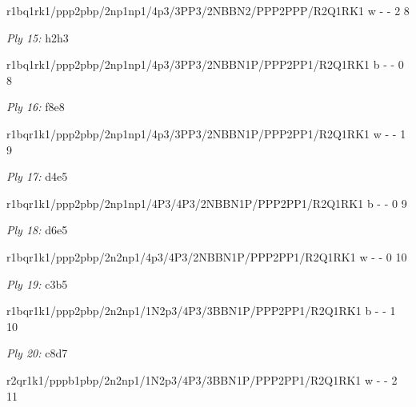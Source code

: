 \documentclass{article}
\begin{document}
r1bq1rk1/ppp2pbp/2np1np1/4p3/3PP3/2NBBN2/PPP2PPP/R2Q1RK1 w - - 2 8


\showboard

\bigskip

\emph{Ply 15:} h2h3


r1bq1rk1/ppp2pbp/2np1np1/4p3/3PP3/2NBBN1P/PPP2PP1/R2Q1RK1 b - - 0 8


\showboard

\bigskip

\emph{Ply 16:} f8e8

r1bqr1k1/ppp2pbp/2np1np1/4p3/3PP3/2NBBN1P/PPP2PP1/R2Q1RK1 w - - 1 9


\showboard

\bigskip

\emph{Ply 17:} d4e5


r1bqr1k1/ppp2pbp/2np1np1/4P3/4P3/2NBBN1P/PPP2PP1/R2Q1RK1 b - - 0 9


\showboard

\bigskip

\emph{Ply 18:} d6e5

r1bqr1k1/ppp2pbp/2n2np1/4p3/4P3/2NBBN1P/PPP2PP1/R2Q1RK1 w - - 0 10


\showboard

\bigskip

\emph{Ply 19:} c3b5


r1bqr1k1/ppp2pbp/2n2np1/1N2p3/4P3/3BBN1P/PPP2PP1/R2Q1RK1 b - - 1 10


\showboard

\bigskip

\emph{Ply 20:} c8d7

r2qr1k1/pppb1pbp/2n2np1/1N2p3/4P3/3BBN1P/PPP2PP1/R2Q1RK1 w - - 2 11


\showboard
\end{document}

